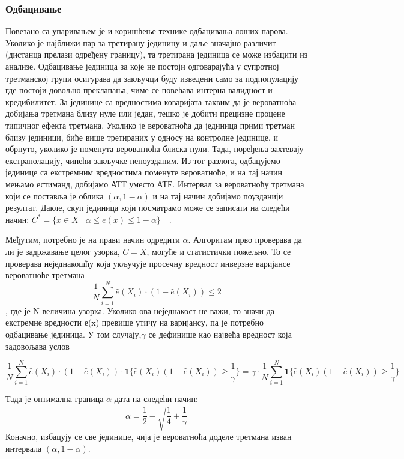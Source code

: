 \documentclass[12pt, a4paper]{article}
\begin{document}
\subsubsection{Одбацивање}
Повезано са упаривањем је и коришћење технике одбацивања лоших парова. Уколико је најближи пар за третирану јединицу и даље значајно различит (дистанца прелази одређену границу), та третирана јединица се може избацити из анализе. Одбацивање јединица за које не постоји одговарајућа у супротној третманској групи осигурава да закључци буду изведени само за подпопулацију где постоји довољно преклапања, чиме се повећава интерна валидност и кредибилитет.  За јединице са вредностима коваријата таквим да је вероватноћа добијања третмана близу нуле или један, тешко је добити прецизне процене типичног ефекта третмана. Уколико је вероватноћа да јединица прими третман близу јединици, биће више третираних у односу на контролне јединице, и обрнуто, уколико је поменута вероватноћа блиска нули. Тада, поређења захтевају екстраполацију, чинећи закључке непоузданим. Из тог разлога, одбацујемо јединице са екстремним вредностима поменуте вероватноће, и на тај начин мењамо естиманд, добијамо АТТ уместо АТЕ.  Интервал за вероватноћу третмана који се поставља је облика $(\alpha, 1-\alpha)$ и на тај начин добијамо поузданији резултат. Дакле, скуп јединица који посматрамо може се записати на следећи начин:  $C^* = \{ x \in X \mid \alpha \le e(x) \le 1 - \alpha \} \quad$. 

Међутим, потребно је на прави начин одредити $\alpha$.  Алгоритам прво проверава да ли је  задржавање целог узорка, $C=X$, могуће и статистички пожељно. То се проверава неједнакошћу која укључује просечну вредност инверзне варијансе вероватноће третмана $$\frac{1}{N} \sum_{i=1}^{N} \hat{e}(X_i) \cdot (1 - \hat{e}(X_i)) \le 2$$, где је N величина узорка. Уколико ова неједнакост не важи, то значи да екстремне вредности е(x) превише утичу на варијансу, па је потребно одбацивање јединица. У том случају,$ \gamma$ се дефинише као највећа вредност која задовољава услов

 $$\frac{1}{N} \sum_{i=1}^{N} \hat{e}(X_i) \cdot (1 - \hat{e}(X_i)) \cdot \mathbf{1}\{ \hat{e}(X_i)(1 - \hat{e}(X_i)) \ge \frac{1}{\gamma} \}= \gamma \cdot \frac{1}{N} \sum_{i=1}^{N} \mathbf{1}\{ \hat{e}(X_i)(1 - \hat{e}(X_i)) \ge \frac{1}{\gamma} \}$$

Тада је оптимална граница $\alpha$ дата на следећи начин:\\$$\alpha = \frac{1}{2} - \sqrt{\frac{1}{4} + \frac{1}{\gamma}}$$
Коначно, избацују се све јединице, чија је вероватноћа доделе третмана изван интервала  $(\alpha, 1-\alpha)$.
\end{document}
